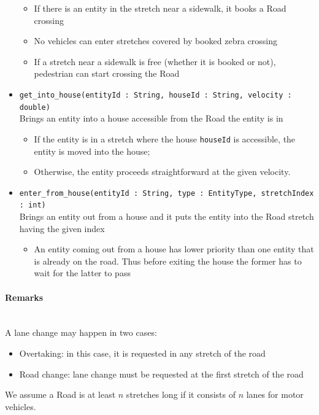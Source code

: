 \begin{itemize}
	\begin{itemize}
		\item If there is an entity in the stretch near a sidewalk, it books a Road crossing
		\item No vehicles can enter stretches covered by booked zebra crossing
		\item If a stretch near a sidewalk is free (whether it is booked or not), pedestrian can start crossing the Road
	\end{itemize}
	\item \texttt{get\_into\_house(entityId : String, houseId : String, velocity : double)}
	\\Brings an entity into a house accessible from the Road the entity is in
	\begin{itemize}
		\item If the entity is in a stretch where the house \texttt{houseId} is accessible, the entity is moved into the house;
		\item Otherwise, the entity proceeds straightforward at the given velocity.
	\end{itemize}
	\item \texttt{enter\_from\_house(entityId : String, type : EntityType, stretchIndex : int)}
	\\Brings an entity out from a house and it puts the entity into the Road stretch having the given index
	\begin{itemize}
		\item An entity coming out from a house has lower priority than one entity that is already on the road. Thus before exiting the house the former has to wait for the latter to pass
	\end{itemize}
\end{itemize}
\paragraph{Remarks}
\ \\A lane change may happen in two cases:
\begin{itemize}
	\item Overtaking: in this case, it is requested in any stretch of the road
	\item Road change: lane change must be requested at the first stretch of the road
\end{itemize}
We assume a Road is at least $n$ stretches long if it consists of $n$ lanes for motor vehicles.

